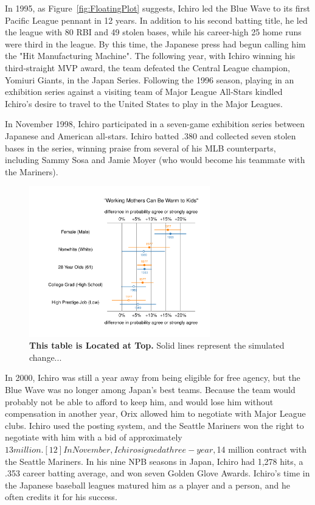 \documentclass[12pt]{article}
\theoremstyle{hypotheses}
\begin{document}
In 1995, as Figure~\ref{fig:FloatingPlot} suggests, Ichiro led the Blue Wave to its first Pacific League pennant in 12 years. In addition to his second batting title, he led the league with 80 RBI and 49 stolen bases, while his career-high 25 home runs were third in the league. By this time, the Japanese press had begun calling him the "Hit Manufacturing Machine". The following year, with Ichiro winning his third-straight MVP award, the team defeated the Central League champion, Yomiuri Giants, in the Japan Series. Following the 1996 season, playing in an exhibition series against a visiting team of Major League All-Stars kindled Ichiro's desire to travel to the United States to play in the Major Leagues.


In November 1998, Ichiro participated in a seven-game exhibition series between Japanese and American all-stars. Ichiro batted .380 and collected seven stolen bases in the series, winning praise from several of his MLB counterparts, including Sammy Sosa and Jamie Moyer (who would become his teammate with the Mariners).

\begin{figure}[t] %
  \begin{center}
      \includegraphics[width=0.7\textwidth]{plots/mothersFD7789.pdf} 
      \vspace{-2.5em}
      \caption{\textbf{This table is Located at Top.} Solid lines represent the simulated change...}
      \label{fig:TopPlot}
  \end{center}
\end{figure} 

In 2000, Ichiro was still a year away from being eligible for free agency, but the Blue Wave was no longer among Japan's best teams. Because the team would probably not be able to afford to keep him, and would lose him without compensation in another year, Orix allowed him to negotiate with Major League clubs. Ichiro used the posting system, and the Seattle Mariners won the right to negotiate with him with a bid of approximately $13 million.[12] In November, Ichiro signed a three-year, $14 million contract with the Seattle Mariners. In his nine NPB seasons in Japan, Ichiro had 1,278 hits, a .353 career batting average, and won seven Golden Glove Awards. Ichiro's time in the Japanese baseball leagues matured him as a player and a person, and he often credits it for his success.
\end{document}
